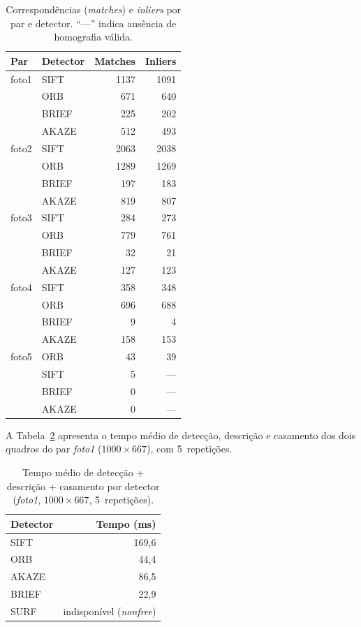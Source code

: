 \documentclass[12pt,a4paper]{article}
\begin{document}
\begin{table}[H]
\centering
\caption{Correspondências (\emph{matches}) e \emph{inliers} por par e detector.
  ``---'' indica ausência de homografia válida.}
\label{tab:registro}
\begin{tabular}{llrr}
\toprule
\textbf{Par} & \textbf{Detector} & \textbf{Matches} & \textbf{Inliers} \\
\midrule
foto1 & SIFT  & 1137 & 1091 \\
      & ORB   &  671 &  640 \\
      & BRIEF &  225 &  202 \\
      & AKAZE &  512 &  493 \\
\midrule
foto2 & SIFT  & 2063 & 2038 \\
      & ORB   & 1289 & 1269 \\
      & BRIEF &  197 &  183 \\
      & AKAZE &  819 &  807 \\
\midrule
foto3 & SIFT  &  284 &  273 \\
      & ORB   &  779 &  761 \\
      & BRIEF &   32 &   21 \\
      & AKAZE &  127 &  123 \\
\midrule
foto4 & SIFT  &  358 &  348 \\
      & ORB   &  696 &  688 \\
      & BRIEF &    9 &    4 \\
      & AKAZE &  158 &  153 \\
\midrule
foto5 & ORB   &   43 &   39 \\
      & SIFT  &    5 & --- \\
      & BRIEF &    0 & --- \\
      & AKAZE &    0 & --- \\
\bottomrule
\end{tabular}
\end{table}

A Tabela~\ref{tab:bench-parte2} apresenta o tempo médio de detecção, descrição e
casamento dos dois quadros do par \emph{foto1} ($1000\times667$), com
5~repetições.

\begin{table}[H]
\centering
\caption{Tempo médio de detecção + descrição + casamento por detector
  (\emph{foto1}, $1000\times667$, 5~repetições).}
\label{tab:bench-parte2}
\begin{tabular}{lr}
\toprule
\textbf{Detector} & \textbf{Tempo (ms)} \\
\midrule
SIFT  & 169{,}6 \\
ORB   &  44{,}4 \\
AKAZE &  86{,}5 \\
BRIEF &  22{,}9 \\
SURF  & indisponível (\emph{nonfree}) \\
\bottomrule
\end{tabular}
\end{table}
\end{document}
